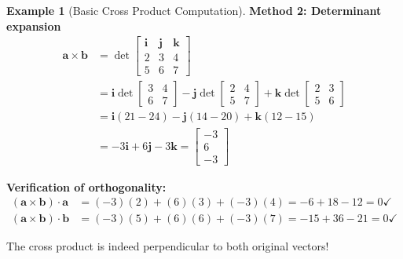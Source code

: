 \documentclass[12pt,a4paper]{article}
\theoremstyle{definition}
\newtheorem{example}{Example}[section]
\begin{document}
\begin{example}[Basic Cross Product Computation]
\textbf{Method 2: Determinant expansion}
\begin{align}
\mathbf{a} \times \mathbf{b} &= \det\begin{bmatrix}
\mathbf{i} & \mathbf{j} & \mathbf{k} \\
2 & 3 & 4 \\
5 & 6 & 7
\end{bmatrix} \\
&= \mathbf{i}\det\begin{bmatrix} 3 & 4 \\ 6 & 7 \end{bmatrix} - \mathbf{j}\det\begin{bmatrix} 2 & 4 \\ 5 & 7 \end{bmatrix} + \mathbf{k}\det\begin{bmatrix} 2 & 3 \\ 5 & 6 \end{bmatrix} \\
&= \mathbf{i}(21-24) - \mathbf{j}(14-20) + \mathbf{k}(12-15) \\
&= -3\mathbf{i} + 6\mathbf{j} - 3\mathbf{k} = \begin{bmatrix} -3 \\ 6 \\ -3 \end{bmatrix}
\end{align}

\textbf{Verification of orthogonality:}
\begin{align}
(\mathbf{a} \times \mathbf{b}) \cdot \mathbf{a} &= (-3)(2) + (6)(3) + (-3)(4) = -6 + 18 - 12 = 0 \checkmark \\
(\mathbf{a} \times \mathbf{b}) \cdot \mathbf{b} &= (-3)(5) + (6)(6) + (-3)(7) = -15 + 36 - 21 = 0 \checkmark
\end{align}

The cross product is indeed perpendicular to both original vectors!
\end{example}
\end{document}
